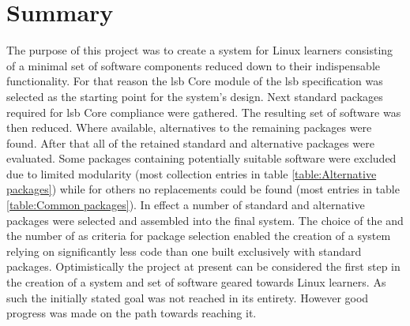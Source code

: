 \section{Summary}\label{Summary}

The purpose of this project was to create a system for Linux learners consisting of a minimal set of software components reduced down to their indispensable functionality. For that reason the \gls{lsb} Core module of the \gls{lsb} specification was selected as the starting point for the system's design. Next standard packages required for \gls{lsb} Core compliance were gathered. The resulting set of software was then reduced. Where available, alternatives to the remaining packages were found. After that all of the retained standard and alternative packages were evaluated. Some packages containing potentially suitable software were excluded due to limited modularity (most collection entries in table \ref{table:Alternative packages}) while for others no replacements could be found (most entries in table \ref{table:Common packages}). In effect a number of standard and alternative packages were selected and assembled into the final system. The choice of the  and the number of  as criteria for package selection enabled the creation of a system relying on significantly less code than one built exclusively with standard packages. Optimistically the project at present can be considered the first step in the creation of a system and set of software geared towards Linux learners. As such the initially stated goal was not reached in its entirety. However good progress was made on the path towards reaching it.
